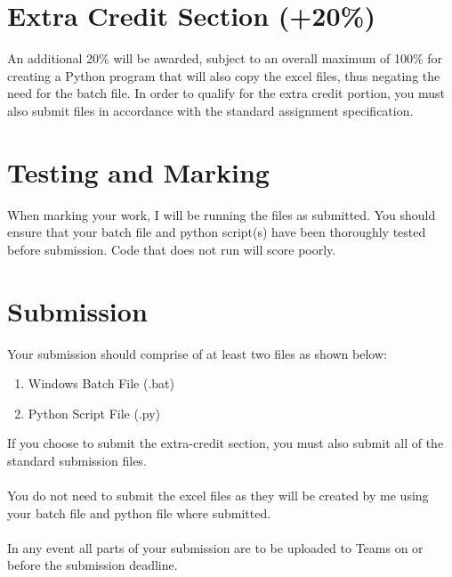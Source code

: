 \section*{Extra Credit Section (+20\%)}
An additional 20\% will be awarded, subject to an overall maximum of 100\% for creating a Python program that will also copy the excel files, thus negating the need for the batch file.  In order to qualify for the extra credit portion, you must also submit files in accordance with the standard assignment specification. 

\section*{Testing and Marking}
When marking your work, I will be running the files as submitted.  You should ensure that your batch file and python script(s) have been thoroughly tested before submission.  Code that does not run will score poorly.     


\section*{Submission}
Your submission should comprise of at least two files as shown below:
\begin{enumerate}
	\item Windows Batch File (.bat)
	\item Python Script File (.py)
\end{enumerate}

If you choose to submit the extra-credit section, you must also submit all of the standard submission files.\\
\\
You do not need to submit the excel files as they will be created by me using your batch file and python file where submitted.\\
\\
In any event all parts of your submission are to be uploaded to Teams on or before the submission deadline.

